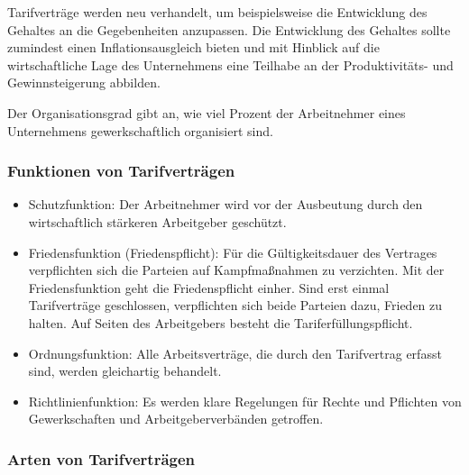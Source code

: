 Tarifverträge werden neu verhandelt, um beispielsweise die Entwicklung des Gehaltes an die Gegebenheiten anzupassen. Die Entwicklung des Gehaltes sollte zumindest einen Inflationsausgleich bieten und mit Hinblick auf die wirtschaftliche Lage des Unternehmens eine Teilhabe an der Produktivitäts- und Gewinnsteigerung abbilden.

Der Organisationsgrad gibt an, wie viel Prozent der Arbeitnehmer eines Unternehmens gewerkschaftlich organisiert sind.

\subsubsection{Funktionen von Tarifverträgen}

	\begin{itemize}
		\item Schutzfunktion: Der Arbeitnehmer wird vor der Ausbeutung durch den wirtschaftlich stärkeren Arbeitgeber geschützt.
		\item Friedensfunktion (Friedenspflicht): Für die Gültigkeitsdauer des Vertrages verpflichten sich die Parteien auf Kampfmaßnahmen zu verzichten. Mit der Friedensfunktion geht die Friedenspflicht einher. Sind erst einmal Tarifverträge geschlossen, verpflichten sich beide Parteien dazu, Frieden zu halten. Auf Seiten des Arbeitgebers besteht die Tariferfüllungspflicht.
		\item Ordnungsfunktion: Alle Arbeitsverträge, die durch den Tarifvertrag erfasst sind, werden gleichartig behandelt.
		\item Richtlinienfunktion: Es werden klare Regelungen für Rechte und Pflichten von Gewerkschaften und Arbeitgeberverbänden getroffen.
	\end{itemize}

\subsubsection{Arten von Tarifverträgen}

